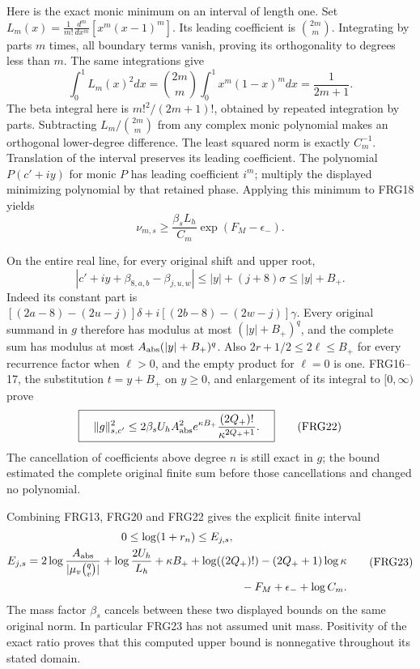\documentclass[11pt,a4paper]{article}
\begin{document}
Here is the exact monic minimum on an interval of length one. Set
$L_m(x)=\frac1{m!}\frac{d^m}{dx^m}[x^m(x-1)^m]$.
Its leading coefficient is $\binom{2m}{m}$. Integrating by parts $m$
times, all boundary terms vanish, proving its orthogonality to degrees
less than $m$. The same integrations give
\[
\int_0^1L_m(x)^2dx
=\binom{2m}{m}\int_0^1x^m(1-x)^m dx=\frac1{2m+1}.
\tag{FRG19}
\]
The beta integral here is $m!^2/(2m+1)!$, obtained by repeated
integration by parts. Subtracting $L_m/\binom{2m}{m}$ from any complex
monic polynomial makes an orthogonal lower-degree difference. The
least squared norm is exactly $C_m^{-1}$. Translation of the interval
preserves its leading coefficient. The polynomial $P(c'+iy)$ for monic
$P$ has leading coefficient $i^m$; multiply the displayed minimizing
polynomial by that retained phase. Applying this minimum to FRG18 yields
\[
\boxed{\quad
\nu_{m,s}\ge\frac{\beta_sL_h}{C_m}
                \exp(F_M-\epsilon_-).\quad}
\tag{FRG20}
\]

On the entire real line, for every original shift and upper root,
\[
|c'+iy+\beta_{8,a,b}-\beta_{j,u,w}|
\le |y|+(j+8)\sigma\le |y|+B_+.
\tag{FRG21}
\]
Indeed its constant part is
$[(2a-8)-(2u-j)]\delta+i[(2b-8)-(2w-j)]\gamma$.
Every original summand in $g$ therefore has modulus at most
$(|y|+B_+)^q$, and the complete sum has modulus at most
$A_{\rm abs}(|y|+B_+)^q$.
Also $2r+1/2\le2\ell\le B_+$ for every recurrence factor when
$\ell>0$, and the empty product for $\ell=0$ is one. FRG16--17,
the substitution $t=y+B_+$ on $y\ge0$, and enlargement of its
integral to $[0,\infty)$ prove
\[
\boxed{\quad
\|g\|_{s,c'}^2\le
2\beta_sU_hA_{\rm abs}^{2}e^{\kappa B_+}
                \frac{(2Q_+)!}{\kappa^{2Q_++1}}.\quad}
\tag{FRG22}
\]
The cancellation of coefficients above degree $n$ is still exact in
$g$; the bound estimated the complete original finite sum before those
cancellations and changed no polynomial.

Combining FRG13, FRG20 and FRG22 gives the explicit finite interval
\[
\begin{gathered}
0\le\log(1+r_n)\le E_{j,s},\\
E_{j,s}=2\log\frac{A_{\rm abs}}{|\mu_v\binom qv|}
 +\log\frac{2U_h}{L_h}+\kappa B_++\log((2Q_+)!)
 -(2Q_++1)\log\kappa\\
\hfill{}-F_M+\epsilon_-+\log C_m.
\end{gathered}\tag{FRG23}
\]
The mass factor $\beta_s$ cancels between these two displayed bounds
on the same original norm. In particular FRG23 has not assumed unit
mass. Positivity of the exact ratio proves that this computed upper
bound is nonnegative throughout its stated domain.
\end{document}
